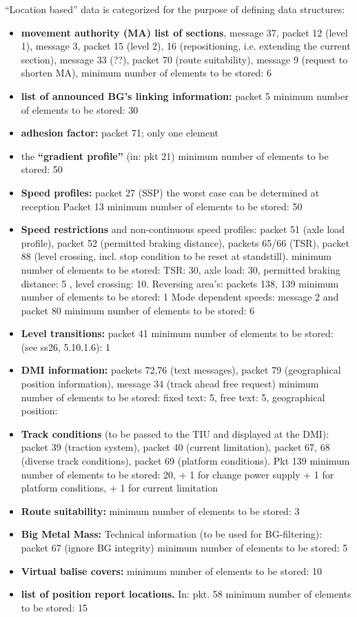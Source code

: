 \documentclass{template/openetcs_report}
\begin{document}
“Location based” data is categorized for the purpose of defining data structures:
\begin{itemize}
\item \textbf{movement authority (MA) list of sections}, message 37, packet 12 (level 1), message 3, packet 15 (level 2), 16 (repositioning, i.e. extending the current section), message 33 (??), packet 70 (route suitability), message 9 (request to shorten MA),    minimum number of elements to be stored: 6
\item \textbf{list of announced BG's linking information:} packet 5  minimum number of elements to be stored: 30
\item \textbf{adhesion factor:} packet 71;  only one element
\item the \textbf{“gradient profile”} (in: pkt 21)  minimum number of elements to be stored: 50
\item \textbf{Speed profiles:}  packet 27 (SSP)  {the worst case can be determined at reception} 
Packet 13	minimum number of elements to be stored: 50
\item \textbf{Speed restrictions} and non-continuous speed profiles: packet 51 (axle load profile), packet 52 (permitted braking distance), packets 65/66 (TSR), packet 88 (level crossing, incl. stop condition to be reset at standstill).  
minimum number of elements to be stored: TSR: 30, axle load: 30, permitted braking distance:  5 , level crossing: 10. 
Reversing area's: packets 138, 139	minimum number of elements to be stored: 1
Mode dependent speeds: message 2  and packet 80  minimum number of elements to be stored: 6
\item \textbf{Level transitions:} packet 41  minimum number of elements to be stored:  (see ss26, 5.10.1.6): 1
\item \textbf{DMI information:} packets 72,76 (text messages), packet 79 (geographical position information), message 34 (track ahead free request)  minimum number of elements to be stored: fixed text: 5, free text: 5, geographical position: 
\item \textbf{Track conditions} (to be passed to the TIU and displayed at the DMI): packet 39 (traction system), packet 40 (current limitation),  packet 67, 68 (diverse track conditions), packet 69 (platform conditions). Pkt 139  minimum number of elements to be stored: 20, + 1 for change power supply + 1 for platform conditions, + 1 for current limitation
\item \textbf{Route suitability:} minimum number of elements to be stored: 3
\item \textbf{Big Metal Mass:} Technical information (to be used for BG-filtering): packet 67 (ignore BG integrity)  minimum number of elements to be stored: 5
\item \textbf{Virtual balise covers:}  minimum number of elements to be stored: 10
\item \textbf{list of position report locations.} In: pkt. 58  minimum number of elements to be stored: 15
\end{itemize}
\end{document}
